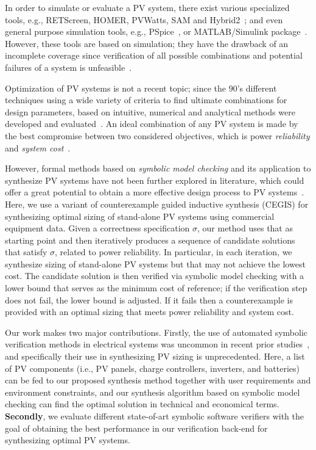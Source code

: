 \documentclass[review]{elsarticle}
\begin{document}
In order to simulate or evaluate a PV system, there exist various specialized tools, e.g., RETScreen, HOMER, PVWatts, SAM and  Hybrid2~\cite{Pradhan,Swarnkar,NRELDobos,NRELBlair,Mills}; and even general purpose simulation tools, e.g.,  PSpice~\cite{Gow1999}, or MATLAB/Simulink package~\cite{Benatiallah2017}. However, these tools are based on simulation; they have the drawback of an incomplete coverage  since verification of all possible combinations and potential failures of a system is unfeasible~\cite{ClarkeHV18}. 

Optimization of PV systems is not a recent topic; since the $90$'s different techniques using a wide variety of criteria to find ultimate combinations for design parameters, based on intuitive, numerical and analytical methods were developed and evaluated~\cite{Applasamy2011}. An ideal combination of any PV system is made by the best compromise between two considered objectives, which is power \textit{reliability} and \textit{system cost}~\cite{Alsadi2018}.
 
However, formal methods based on \textit{symbolic model checking} and its application 
to synthesize PV systems have not been further explored in literature, which could offer 
a great potential to obtain a more effective design process to PV systems~\cite{ClarkeHV18}. 
Here, we use a variant of counterexample guided inductive synthesis (CEGIS) for synthesizing 
optimal sizing of stand-alone PV systems using commercial equipment data. 
Given a correctness specification $\sigma$, our method uses that as starting point 
and then iteratively produces a sequence of candidate solutions that satisfy $\sigma$, 
related to power reliability. In particular, in each iteration, we synthesize sizing of 
stand-alone PV systems but that may not achieve the lowest cost. The candidate solution 
is then verified via symbolic model checking with a lower bound that serves as the minimum 
cost of reference; if the verification step does not fail, the lower bound is adjusted. 
If it fails then a counterexample is provided with an optimal sizing that meets 
power reliability and system cost.

Our work makes two major contributions. Firstly, the use of automated 
symbolic verification methods in electrical systems was uncommon in recent 
prior studies~\cite{abs-1811-09438}, and specifically their use in synthesizing 
PV sizing is unprecedented. Here, a list of PV components (i.e., PV panels, 
charge controllers, inverters, and batteries) can be fed to our proposed synthesis 
method together with user requirements and environment constraints, 
and our synthesis algorithm based on symbolic model checking 
can find the optimal solution in technical and economical terms. 
\textbf{Secondly}, we evaluate different state-of-art symbolic software 
verifiers with the goal of obtaining the best performance in our verification 
back-end for synthesizing optimal PV systems.
\end{document}
